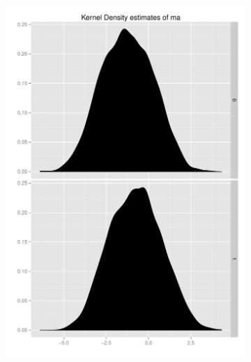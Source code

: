 \documentclass[11pt,letterpaper]{article}
\begin{document}
\begin{figure}[h]
    \begin{subfigure}[b]{0.3\textwidth}\centering \includegraphics[width=1\textwidth]{ma} \end{subfigure}


\end{figure}
\end{document}
